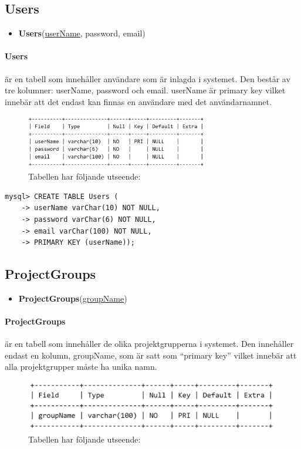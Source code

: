 \documentclass[paper=a4, fontsize=11pt,twoside]{article}
\begin{document}
\newpage
\subsection{Users}
\begin{itemize}
\item[] \textbf{Users}(\underline{userName}, password, email)
\end{itemize}
\paragraph{Users} är en tabell som innehåller användare som är inlagda i systemet. Den består av tre kolumner: userName, password och email. userName är primary key vilket innebär att det endast kan finnas en användare med det användarnamnet.

\begin{figure}[H]
\centering
\caption{Tabellen har följande utseende:}
\includegraphics[width=8cm]{UsersTable}
\end{figure}

\begin{lstlisting}[frame=single, caption={Tabellen kan konstrueras med följande SQL-satser:}]
mysql> CREATE TABLE Users (
    -> userName varChar(10) NOT NULL,
    -> password varChar(6) NOT NULL,
    -> email varChar(100) NOT NULL,
    -> PRIMARY KEY (userName));
\end{lstlisting}

\subsection{ProjectGroups}
\begin{itemize}
\item[] \textbf{ProjectGroups}(\underline{groupName})
\end{itemize}
\paragraph{ProjectGroups} är en tabell som innehåller de olika projektgrupperna i systemet. Den innehåller endast en kolumn, groupName, som är satt som ``primary key'' vilket innebär att alla projektgrupper måste ha unika namn.

\begin{figure}[H]
\centering
\caption{Tabellen har följande utseende:}
\includegraphics{ProjectGroupsTable}
\end{figure}
\end{document}
